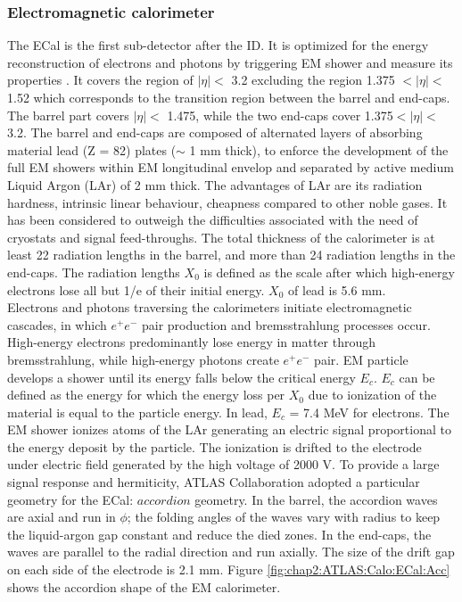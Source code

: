 \subsubsection{Electromagnetic calorimeter}
\label{chap2:ATLAS:Calo:ECAL}
The ECal is the first sub-detector after the ID. It is optimized for the energy reconstruction of electrons and photons by triggering EM shower and measure its properties \cite{LAr_TRD}. It covers the region of $|\eta| < $ 3.2 excluding the region 1.375 $ < |\eta| < $ 1.52 which corresponds to the transition region between the barrel and end-caps. The barrel part covers $|\eta| < $ 1.475, while the two end-caps cover 1.375$ < |\eta| < $ 3.2. The barrel and end-caps are composed of alternated layers of absorbing material lead (Z = 82) plates ($\sim$ 1 mm thick), to enforce the development of the full EM showers within EM longitudinal envelop and separated by active medium Liquid Argon (LAr) of 2 mm thick. The advantages of LAr are its radiation hardness, intrinsic linear behaviour, cheapness compared to other noble gases. It has been considered to outweigh the difficulties associated with the need of cryostats and signal feed-throughs. The total thickness of the calorimeter is at least 22 radiation lengths in the barrel, and more than 24 radiation lengths in the end-caps. The radiation lengths $X_0$ is defined as the scale after which high-energy electrons lose all but 1/e of their initial energy. $X_0$ of lead is 5.6 mm. \\
Electrons and photons traversing the calorimeters initiate electromagnetic cascades, in which $e^+e^-$ pair production and bremsstrahlung processes occur. High-energy electrons predominantly lose energy in matter through bremsstrahlung, while high-energy photons create $e^+e^-$ pair. EM particle develops a shower until its energy falls below the critical energy $E_c$. $E_c$ can be defined as the energy for which the energy loss per $X_0$ due to ionization of the material is equal to the particle energy. In lead, $E_c$ = 7.4 MeV for electrons. The EM shower ionizes atoms of the LAr generating an electric signal proportional to the energy deposit by the particle. The ionization is drifted to the electrode under electric field generated by the high voltage of 2000 V. To provide a large signal response and hermiticity, ATLAS Collaboration adopted a particular geometry for the ECal: $accordion$ geometry. In the barrel, the accordion waves are axial and run in $\phi$; the folding angles of the waves vary with radius to keep the liquid-argon gap constant and reduce the died zones. In the end-caps, the waves are parallel to the radial direction and run axially. The size of the drift gap on each side of the electrode is 2.1 mm. Figure \ref{fig:chap2:ATLAS:Calo:ECal:Acc} shows the accordion shape of the EM calorimeter.
